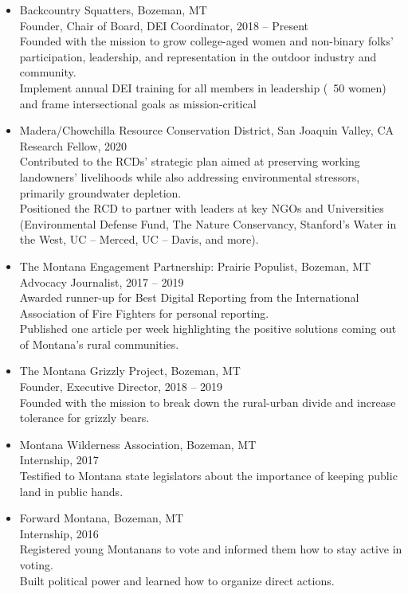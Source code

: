 \documentclass[11pt]{article}
\begin{document}
\begin{itemize}[left=0pt]
    \item Backcountry Squatters, Bozeman, MT \\
    Founder, Chair of Board, DEI Coordinator, 2018 – Present \\
    Founded with the mission to grow college-aged women and non-binary folks’ participation, leadership, and representation in the outdoor industry and community. \\
    Implement annual DEI training for all members in leadership (~50 women) and frame intersectional goals as mission-critical
    \item Madera/Chowchilla Resource Conservation District, San Joaquin Valley, CA \\
    Research Fellow, 2020 \\
    Contributed to the RCDs’ strategic plan aimed at preserving working landowners’ livelihoods while also addressing environmental stressors, primarily groundwater depletion. \\
    Positioned the RCD to partner with leaders at key NGOs and Universities (Environmental Defense Fund, The Nature Conservancy, Stanford’s Water in the West, UC – Merced, UC – Davis, and more).
    \item The Montana Engagement Partnership: Prairie Populist, Bozeman, MT \\
    Advocacy Journalist, 2017 – 2019 \\
    Awarded runner-up for Best Digital Reporting from the International Association of Fire Fighters for personal reporting. \\
    Published one article per week highlighting the positive solutions coming out of Montana’s rural communities.
    \item The Montana Grizzly Project, Bozeman, MT \\
    Founder, Executive Director, 2018 – 2019 \\
    Founded with the mission to break down the rural-urban divide and increase tolerance for grizzly bears.
    \item Montana Wilderness Association, Bozeman, MT \\
    Internship, 2017 \\
    Testified to Montana state legislators about the importance of keeping public land in public hands.
    \item Forward Montana, Bozeman, MT \\
    Internship, 2016 \\
    Registered young Montanans to vote and informed them how to stay active in voting. \\
    Built political power and learned how to organize direct actions.
\end{itemize}
\end{document}
